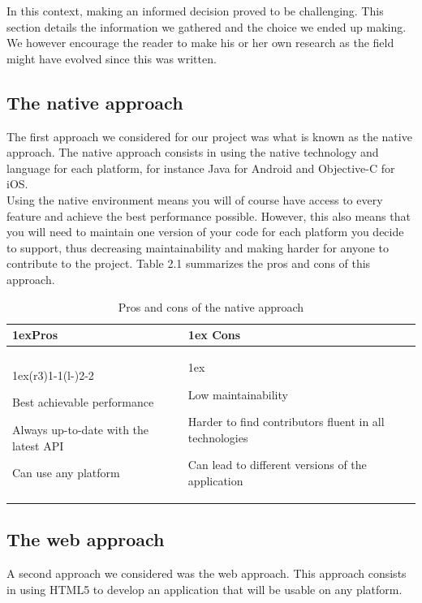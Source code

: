 \documentclass{eplmastersthesis}
\begin{document}
 In this context, making an informed decision proved to be challenging. This section details the information we gathered and the choice we ended up making. We however encourage the reader to make his or her own research as the field might have evolved since this was written.

\subsection{The native approach}

The first approach we considered for our project was what is known as the native approach. The native approach consists in using the native technology and language for each platform, for instance Java for Android and Objective-C for iOS. \\

Using the native environment means you will of course have access to every feature and achieve the best performance possible. However, this also means that you will need to maintain one version of your code for each platform you decide to support, thus decreasing maintainability and making harder for anyone to contribute to the project. Table 2.1 summarizes the pros and cons of this approach.

\begin{table}[H]
\begin{tabularx}{\linewidth}{>{\parskip1ex}X@{\kern4\tabcolsep}>{\parskip1ex}X}
\toprule
\hfil\bfseries Pros
&
\hfil\bfseries Cons
\\\cmidrule(r{3\tabcolsep}){1-1}\cmidrule(l{-\tabcolsep}){2-2}

Best achievable performance\par
Always up-to-date with the latest API\par
Can use any platform\par

&

Low maintainability\par
Harder to find contributors fluent in all technologies\par
Can lead to different versions of the application\par


\\\bottomrule
\end{tabularx}
\caption{Pros and cons of the native approach}
\end{table}

\subsection{The web approach}
A second approach we considered was the web approach. This approach consists in using HTML5 to develop an application that will be usable on any platform. \\
\end{document}
